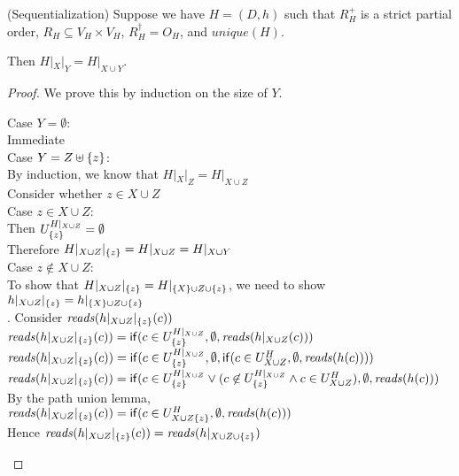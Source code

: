 \begin{lemma}{(Sequentialization)}
Suppose we have $H = (D,h)$ such that $R^+_H$ is a strict partial
order, $R_H \subseteq V_H \times V_H$, $R^\dagger_H = O_H$, and
$\mathit{unique}(H)$.

Then $H|_X|_Y = H|_{X \cup Y}$.
\end{lemma}

\begin{proof}
We prove this by induction on the size of $Y$. 
\begin{tabbedproof}
\oo Case $Y = \emptyset$: \\
\ooo Immediate \\
\oo Case $Y = Z \uplus \{{z}\}$: \\
\ooo By induction, we know that $H|_X|_Z = H|_{X \cup Z}$ \\
\ooo Consider whether $z \in X \cup Z$ \\
\ooo Case $z \in X \cup Z$: \\
\oooo Then $U^{H|_{X \cup Z}}_{\{{z}\}} = \emptyset$ \\
\oooo Therefore $H|_{X \cup Z}|_{\{{z}\}} = H|_{X \cup Z} = H|_{X \cup Y}$  \\ 
\ooo Case $z \not\in X \cup Z$: \\
\oooo To show that $H|_{X \cup Z}|_{\{{z}\}} = H|_{\{{X}\} \cup Z \cup \{{z}\}} $, we need to show $h|_{X \cup Z}|_{\{{z}\}} = h|_{\{{X}\} \cup Z \cup \{{z}\}}$ \\
. Consider $\mathit{reads}(h|_{X \cup Z}|_{\{{z}\}}(c))$ \\
\ooooo $\mathit{reads}(h|_{X \cup Z}|_{\{{z}\}}(c)) = \mathsf{if}({c \in U^{H|_{X \cup Z}}_{\{{z}\}}}, {\emptyset}, {\mathit{reads}(h|_{X \cup Z}(c))})$ \\
\ooooo $\mathit{reads}(h|_{X \cup Z}|_{\{{z}\}}(c)) = \mathsf{if}({c \in U^{H|_{X \cup Z}}_{\{{z}\}}}, {\emptyset}, {\mathsf{if}({c \in U^H_{X \cup Z}}, {\emptyset}, {\mathit{reads}(h(c))})})$ \\
\ooooo $\mathit{reads}(h|_{X \cup Z}|_{\{{z}\}}(c)) = \mathsf{if}({c \in U^{H|_{X \cup Z}}_{\{{z}\}} \vee (c \not\in U^{H|_{X \cup Z}}_{\{{z}\}} \land c \in U^H_{X \cup Z})}, {\emptyset}, {\mathit{reads}(h(c))})$ \\
\ooooo By the path union lemma, \\
\ooooox $\mathit{reads}(h|_{X \cup Z}|_{\{{z}\}}(c)) = \mathsf{if}({c \in U^H_{X \cup Z \{{z}\}}}, {\emptyset}, {\mathit{reads}(h(c))})$ \\
\ooooo Hence $\mathit{reads}(h|_{X \cup Z}|_{\{{z}\}}(c)) = \mathit{reads}(h|_{X \cup Z \cup \{{z}\}})$ \\

\end{tabbedproof}
\end{proof}
